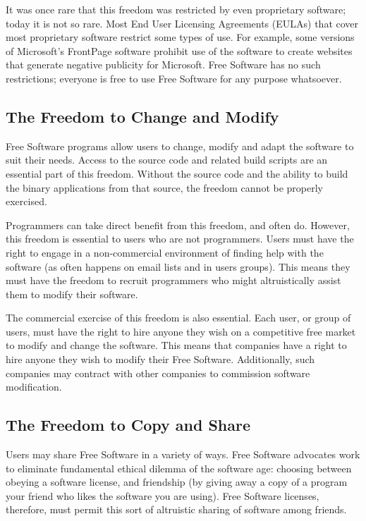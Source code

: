 \documentclass[12pt]{report}
\begin{document}
It was once rare that this freedom was restricted by even proprietary
software; today it is not so rare.  Most End User Licensing Agreements
(EULAs) that cover most proprietary software restrict some types of use.
For example, some versions of Microsoft's FrontPage software prohibit use
of the software to create websites that generate negative publicity for
Microsoft.  Free Software has no such restrictions; everyone is free to
use Free Software for any purpose whatsoever.

\subsection{The Freedom to Change and Modify}

Free Software programs allow users to change, modify and adapt the
software to suit their needs.  Access to the source code and related build
scripts are an essential part of this freedom.  Without the source code
and the ability to build the binary applications from that source, the
freedom cannot be properly exercised.

Programmers can take direct benefit from this freedom, and often do.
However, this freedom is essential to users who are not programmers.
Users must have the right to engage in a non-commercial environment of
finding help with the software (as often happens on email lists and in
users groups).  This means they must have the freedom to recruit
programmers who might altruistically assist them to modify their software.

The commercial exercise of this freedom is also essential.  Each user, or
group of users, must have the right to hire anyone they wish on a
competitive free market to modify and change the software.  This means
that companies have a right to hire anyone they wish to modify their Free
Software.  Additionally, such companies may contract with other companies
to commission software modification.

\subsection{The Freedom to Copy and Share}

Users may share Free Software in a variety of ways.  Free Software
advocates work to eliminate fundamental ethical dilemma of the software
age: choosing between obeying a software license, and friendship (by
giving away a copy of a program your friend who likes the software you are
using).  Free Software licenses, therefore, must permit this sort of
altruistic sharing of software among friends.
\end{document}
